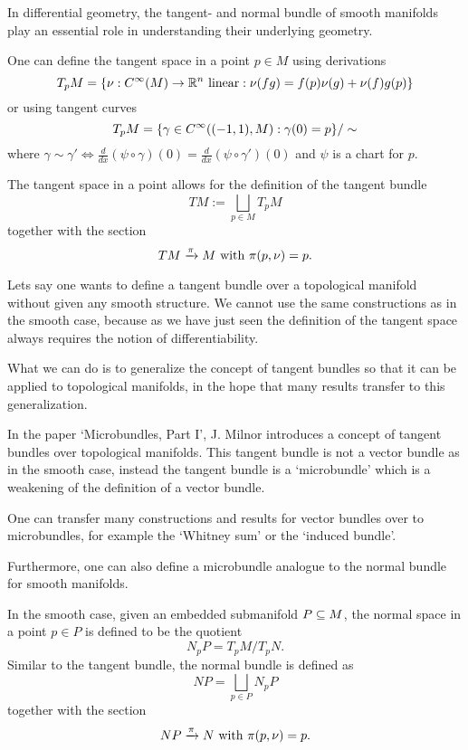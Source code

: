\begin{myparagraph}
    In differential geometry,
    the tangent- and normal bundle of smooth manifolds
    play an essential role in understanding their underlying geometry.

    One can define the tangent space
    in a point $p \in M$ using derivations
    \[ T_p M = \{\nu: C^\infty(M) \to \mathbb{R}^n \text{ linear}:\nu(fg) = f(p)\nu(g) + \nu(f)g(p)\} \]    
    or using tangent curves
    \[ T_p M = \{\gamma \in C^\infty((-1, 1), M):\gamma(0) = p \} / \sim \]
    where $\gamma \sim \gamma' \iff \frac{d}{dx}(\psi \circ \gamma)(0) = \frac{d}{dx}(\psi \circ \gamma')(0)$
    and $\psi$ is a chart for $p$.
    
    The tangent space in a point allows for the definition of the tangent bundle
    \[ TM := \bigsqcup_{p \in M} T_p M\]
    together with the section
    \[ TM \xrightarrow{\pi} M \text{ with } \pi(p, \nu) = p. \]

    Lets say one wants to define a tangent bundle over a topological manifold
    without given any smooth structure.
    We cannot use the same constructions as in the smooth case, because
    as we have just seen the definition of
    the tangent space always requires the notion of differentiability.

    What we can do is to generalize the concept of tangent bundles
    so that it can be applied to topological manifolds,
    in the hope that many results transfer to this generalization.

    In the paper `Microbundles, Part I', J. Milnor introduces a concept
    of tangent bundles over topological manifolds.
    This tangent bundle is not a vector bundle as in the smooth case,
    instead the tangent bundle is a `microbundle'
    which is a weakening of the definition of a vector bundle.

    One can transfer many constructions and results for
    vector bundles over to microbundles,
    for example the `Whitney sum' or the `induced bundle'. 

    Furthermore, one can also define a microbundle analogue
    to the normal bundle for smooth manifolds.

    In the smooth case, given an embedded submanifold $P \subseteq{} M$,
    the normal space in a point $p \in P$
    is defined to be the quotient
    \[ N_p P = T_p M / T_p N. \]
    Similar to the tangent bundle, the normal bundle is defined as
    \[ NP  = \bigsqcup_{p \in P} N_p P \]
    together with the section
    \[ NP \xrightarrow{\pi} N \text{ with } \pi(p, \nu) = p. \]
    

\end{myparagraph}
